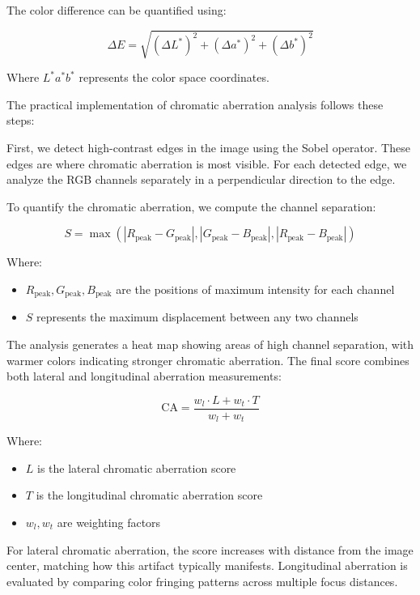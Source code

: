 The color difference can be quantified using:

\begin{equation}
\Delta E = \sqrt{(\Delta L^*)^2 + (\Delta a^*)^2 + (\Delta b^*)^2}
\end{equation}

Where \( L^*a^*b^* \) represents the color space coordinates.

The practical implementation of chromatic aberration analysis follows these steps:

First, we detect high-contrast edges in the image using the Sobel operator. These edges are where chromatic aberration is most visible. For each detected edge, we analyze the RGB channels separately in a perpendicular direction to the edge.

To quantify the chromatic aberration, we compute the channel separation:

\begin{equation}
S = \max\left(|R_{\text{peak}} - G_{\text{peak}}|, |G_{\text{peak}} - B_{\text{peak}}|, |R_{\text{peak}} - B_{\text{peak}}|\right)
\end{equation}

Where:
\begin{itemize}
    \item \( R_{\text{peak}}, G_{\text{peak}}, B_{\text{peak}} \) are the positions of maximum intensity for each channel
    \item \( S \) represents the maximum displacement between any two channels
\end{itemize}

The analysis generates a heat map showing areas of high channel separation, with warmer colors indicating stronger chromatic aberration. The final score combines both lateral and longitudinal aberration measurements:

\begin{equation}
\text{CA} = \frac{w_l \cdot L + w_t \cdot T}{w_l + w_t}
\end{equation}

Where:
\begin{itemize}
    \item \( L \) is the lateral chromatic aberration score
    \item \( T \) is the longitudinal chromatic aberration score
    \item \( w_l, w_t \) are weighting factors
\end{itemize}

For lateral chromatic aberration, the score increases with distance from the image center, matching how this artifact typically manifests. Longitudinal aberration is evaluated by comparing color fringing patterns across multiple focus distances.

